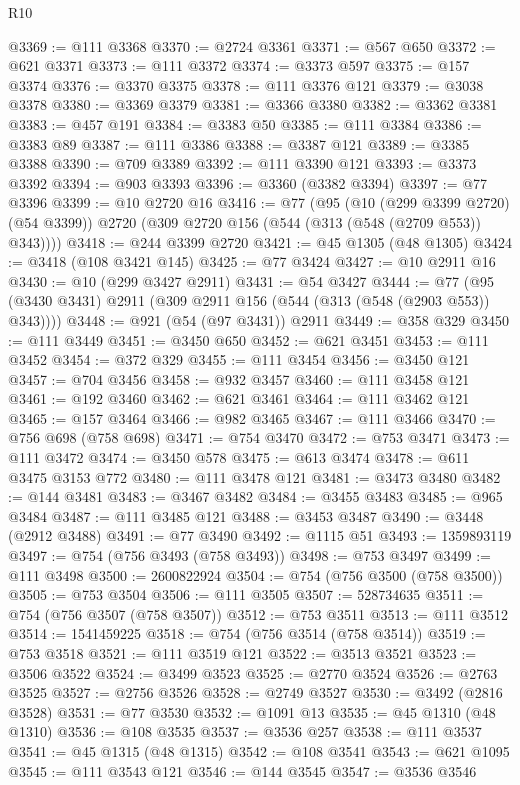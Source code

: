 \begin{lexlean}{R10}
\begin{coremodule}
@3369 := @111 @3368
@3370 := @2724 @3361
@3371 := @567 @650
@3372 := @621 @3371
@3373 := @111 @3372
@3374 := @3373 @597
@3375 := @157 @3374
@3376 := @3370 @3375
@3378 := @111 @3376 @121
@3379 := @3038 @3378
@3380 := @3369 @3379
@3381 := @3366 @3380
@3382 := @3362 @3381
@3383 := @457 @191
@3384 := @3383 @50
@3385 := @111 @3384
@3386 := @3383 @89
@3387 := @111 @3386
@3388 := @3387 @121
@3389 := @3385 @3388
@3390 := @709 @3389
@3392 := @111 @3390 @121
@3393 := @3373 @3392
@3394 := @903 @3393
@3396 := @3360 (@3382 @3394)
@3397 := @77 @3396
@3399 := @10 @2720 @16
@3416 := @77
    (@95
      (@10 (@299 @3399 @2720) (@54 @3399))
      @2720
      (@309 @2720 @156 (@544 (@313 (@548 (@2709 @553)) @343))))
@3418 := @244 @3399 @2720
@3421 := @45 @1305 (@48 @1305)
@3424 := @3418 (@108 @3421 @145)
@3425 := @77 @3424
@3427 := @10 @2911 @16
@3430 := @10 (@299 @3427 @2911)
@3431 := @54 @3427
@3444 := @77 (@95 (@3430 @3431) @2911 (@309 @2911 @156 (@544 (@313 (@548 (@2903 @553)) @343))))
@3448 := @921 (@54 (@97 @3431)) @2911
@3449 := @358 @329
@3450 := @111 @3449
@3451 := @3450 @650
@3452 := @621 @3451
@3453 := @111 @3452
@3454 := @372 @329
@3455 := @111 @3454
@3456 := @3450 @121
@3457 := @704 @3456
@3458 := @932 @3457
@3460 := @111 @3458 @121
@3461 := @192 @3460
@3462 := @621 @3461
@3464 := @111 @3462 @121
@3465 := @157 @3464
@3466 := @982 @3465
@3467 := @111 @3466
@3470 := @756 @698 (@758 @698)
@3471 := @754 @3470
@3472 := @753 @3471
@3473 := @111 @3472
@3474 := @3450 @578
@3475 := @613 @3474
@3478 := @611 @3475 @3153 @772
@3480 := @111 @3478 @121
@3481 := @3473 @3480
@3482 := @144 @3481
@3483 := @3467 @3482
@3484 := @3455 @3483
@3485 := @965 @3484
@3487 := @111 @3485 @121
@3488 := @3453 @3487
@3490 := @3448 (@2912 @3488)
@3491 := @77 @3490
@3492 := @1115 @51
@3493 := 1359893119
@3497 := @754 (@756 @3493 (@758 @3493))
@3498 := @753 @3497
@3499 := @111 @3498
@3500 := 2600822924
@3504 := @754 (@756 @3500 (@758 @3500))
@3505 := @753 @3504
@3506 := @111 @3505
@3507 := 528734635
@3511 := @754 (@756 @3507 (@758 @3507))
@3512 := @753 @3511
@3513 := @111 @3512
@3514 := 1541459225
@3518 := @754 (@756 @3514 (@758 @3514))
@3519 := @753 @3518
@3521 := @111 @3519 @121
@3522 := @3513 @3521
@3523 := @3506 @3522
@3524 := @3499 @3523
@3525 := @2770 @3524
@3526 := @2763 @3525
@3527 := @2756 @3526
@3528 := @2749 @3527
@3530 := @3492 (@2816 @3528)
@3531 := @77 @3530
@3532 := @1091 @13
@3535 := @45 @1310 (@48 @1310)
@3536 := @108 @3535
@3537 := @3536 @257
@3538 := @111 @3537
@3541 := @45 @1315 (@48 @1315)
@3542 := @108 @3541
@3543 := @621 @1095
@3545 := @111 @3543 @121
@3546 := @144 @3545
@3547 := @3536 @3546

\end{coremodule}
\end{lexlean}
